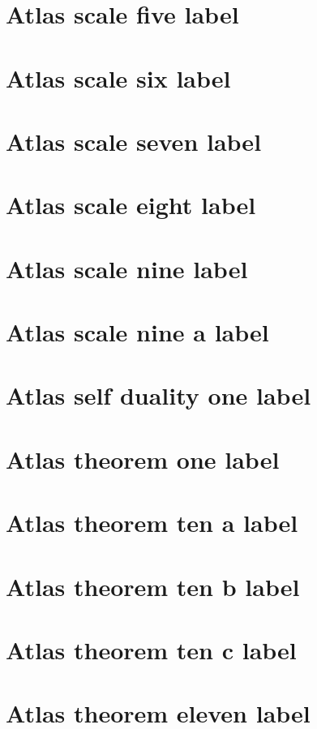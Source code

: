 \documentclass[11pt]{article}
\theoremstyle{definition}
\begin{document}
\section{Atlas scale five label}
\label{ll:labels:atlas-s5}
\section{Atlas scale six label}
\label{ll:labels:atlas-s6}
\section{Atlas scale seven label}
\label{ll:labels:atlas-s7}
\section{Atlas scale eight label}
\label{ll:labels:atlas-s8}
\section{Atlas scale nine label}
\label{ll:labels:atlas-s9}
\section{Atlas scale nine a label}
\label{ll:labels:atlas-s9a}
\section{Atlas self duality one label}
\label{ll:labels:atlas-sd1}
\section{Atlas theorem one label}
\label{ll:labels:atlas-t1}
\section{Atlas theorem ten a label}
\label{ll:labels:atlas-t10a}
\section{Atlas theorem ten b label}
\label{ll:labels:atlas-t10b}
\section{Atlas theorem ten c label}
\label{ll:labels:atlas-t10c}
\section{Atlas theorem eleven label}
\label{ll:labels:atlas-t11}
\end{document}
